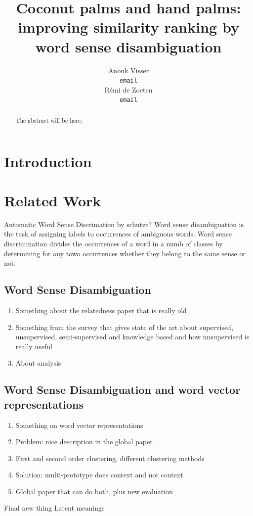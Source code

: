 \documentclass[11pt]{article}
\title{Coconut palms and hand palms: improving similarity ranking by word sense disambiguation}
\author{Anouk Visser \\
  {\tt email} \\\And
  R\'emi de Zoeten \\
  {\tt email} \\}
\date{}
\begin{document}
\maketitle
\begin{abstract}
The abstract will be here.
\end{abstract}

\section{Introduction}

\section{Related Work}
Automatic Word Sense Discrimation by schutze?
Word sense disambiguation is the task of assigning labels to occurrences of ambiguous words. 
Word sense discrimination divides the occurrences of a word in a numb of classes by determining for any towo occurrences whether they belong to the same sense or not. 
\subsection{Word Sense Disambiguation}
\begin{enumerate}
\item Something about the relatedness paper that is really old \cite{relatedness}
\item Something from the survey that gives state of the art about supervised, unsupervised, semi-supervised and knowledge based and how unsupervised is really useful \cite{survey}
\item About analysis \cite{analysis}
\end{enumerate}
\subsection{Word Sense Disambiguation and word vector representations}
\begin{enumerate}
\item Something on word vector representations \cite{word2vec}
\item Problem: nice description in the global paper \cite{global}
\item First and second order clustering, different clustering methods \cite{clustering}
\item Solution: multi-prototype does context and not context \cite{multi}
\item Global paper that can do both, plus new evaluation \cite{global}
\end{enumerate}
Final new thing
Latent meanings \cite{latent}
\end{document}
